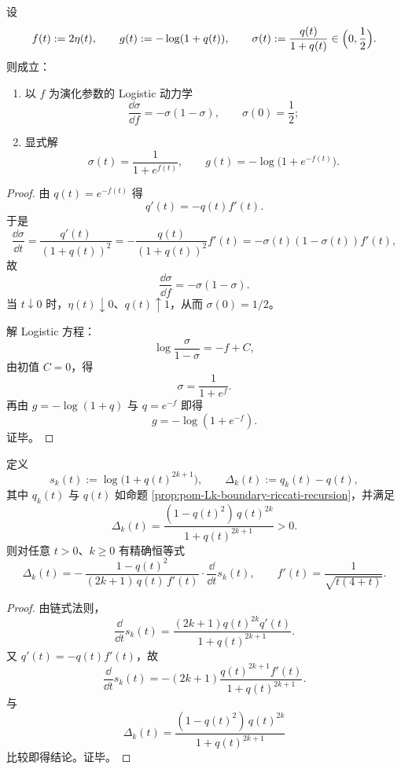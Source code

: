 \begin{theorem}\label{thm:conclusion-surface-term-logistic-transport}
设
\[
f(t):=2\eta(t),\qquad
g(t):=-\log(1+q(t)),
\qquad
\sigma(t):=\frac{q(t)}{1+q(t)}\in\Bigl(0,\frac12\Bigr).
\]
则成立：
\begin{enumerate}
  \item 以 \(f\) 为演化参数的 Logistic 动力学
  \[
  \frac{\dd \sigma}{\dd f}=-\sigma(1-\sigma),
  \qquad
  \sigma(0)=\frac12;
  \]
  \item 显式解
  \[
  \sigma(t)=\frac{1}{1+e^{f(t)}},
  \qquad
  g(t)=-\log\!\bigl(1+e^{-f(t)}\bigr).
  \]
\end{enumerate}
\end{theorem}
\begin{proof}
由 \(q(t)=e^{-f(t)}\) 得
\[
q'(t)=-q(t)f'(t).
\]
于是
\[
\frac{\dd \sigma}{\dd t}
=\frac{q'(t)}{(1+q(t))^2}
=-\frac{q(t)}{(1+q(t))^2}f'(t)
=-\sigma(t)(1-\sigma(t))f'(t),
\]
故
\[
\frac{\dd\sigma}{\dd f}=-\sigma(1-\sigma).
\]
当 \(t\downarrow 0\) 时，\(\eta(t)\downarrow0\)、\(q(t)\uparrow1\)，从而 \(\sigma(0)=1/2\)。

解 Logistic 方程：
\[
\log\frac{\sigma}{1-\sigma}=-f+C,
\]
由初值 \(C=0\)，得
\[
\sigma=\frac{1}{1+e^f}.
\]
再由 \(g=-\log(1+q)\) 与 \(q=e^{-f}\) 即得
\[
g=-\log(1+e^{-f}).
\]
证毕。
\end{proof}

\begin{theorem}[边界反射误差与有限尺寸校正的导数同一性]\label{thm:conclusion-boundary-reflection-derivative-identity}
定义
\[
s_k(t):=\log\!\bigl(1+q(t)^{2k+1}\bigr),
\qquad
\Delta_k(t):=q_k(t)-q(t),
\]
其中 \(q_k(t)\) 与 \(q(t)\) 如命题 \ref{prop:pom-Lk-boundary-riccati-recursion}，并满足
\[
\Delta_k(t)=\frac{(1-q(t)^2)\,q(t)^{2k}}{1+q(t)^{2k+1}}>0.
\]
则对任意 \(t>0\)、\(k\ge 0\) 有精确恒等式
\[
\Delta_k(t)
=
-\,\frac{1-q(t)^2}{(2k+1)\,q(t)\,f'(t)}
\cdot\frac{\dd}{\dd t}s_k(t),
\qquad
f'(t)=\frac{1}{\sqrt{t(4+t)}}.
\]
\end{theorem}
\begin{proof}
由链式法则，
\[
\frac{\dd}{\dd t}s_k(t)
=\frac{(2k+1)q(t)^{2k}q'(t)}{1+q(t)^{2k+1}}.
\]
又 \(q'(t)=-q(t)f'(t)\)，故
\[
\frac{\dd}{\dd t}s_k(t)
=-(2k+1)\frac{q(t)^{2k+1}f'(t)}{1+q(t)^{2k+1}}.
\]
与
\[
\Delta_k(t)=\frac{(1-q(t)^2)\,q(t)^{2k}}{1+q(t)^{2k+1}}
\]
比较即得结论。证毕。
\end{proof}

